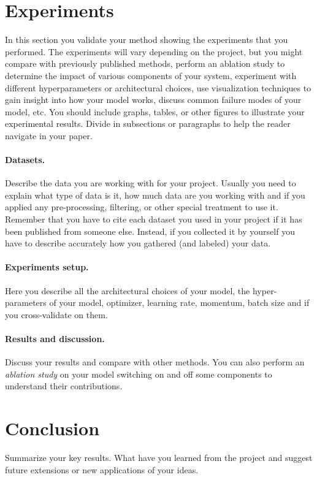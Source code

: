 \documentclass[10pt,twocolumn,letterpaper]{article}
\begin{document}
\section{Experiments}
In this section you validate your method showing the experiments that you performed. The experiments will vary depending on the project, but you might compare with previously published methods, perform an ablation study to determine the impact of various components of your system, experiment with different hyperparameters or architectural choices, use visualization techniques to gain insight into how your model works, discuss common failure modes of your model, etc. You should include graphs, tables, or other figures to illustrate your experimental results. Divide in subsections or paragraphs to help the reader navigate in your paper.

\paragraph{Datasets.}
Describe the data you are working with for your project. Usually you need to explain what type of data is it, how much data are you working with and if you applied any pre-processing, filtering, or other special treatment to use it. Remember that you have to cite each dataset you used in your project if it has been published from someone else. Instead, if you collected it by yourself you have to describe accurately how you gathered (and labeled) your data. 

\paragraph{Experiments setup.}
Here you describe all the architectural choices of your model, the hyper-parameters of your model, \eg optimizer, learning rate, momentum, batch size and if you cross-validate on them. 

\paragraph{Results and discussion.}
Discuss your results and compare with other methods. You can also perform an \emph{ablation study} on your model switching on and off some components to understand their contributions.

\section{Conclusion} 
Summarize your key results. What have you learned from the project and suggest future extensions or new applications of your ideas.
\end{document}
